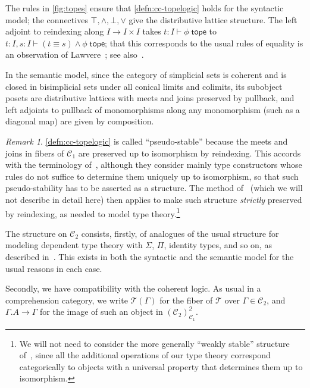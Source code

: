 \documentclass[12pt]{amsart}
\theoremstyle{plain}
\theoremstyle{definition}
\theoremstyle{remark}
\newtheorem{rmk}[thm]{Remark}
\numberwithin{equation}{section}
\newcommand{\jdeq}{\equiv}
\newcommand{\types}{\vdash}
\newcommand{\tope}{\;\mathsf{tope}}
\newcommand{\two}{\mathbb{2}}
\newcommand{\C}{\mathcal{C}}
\newcommand{\T}{\mathcal{T}}
\begin{document}
The rules in \cref{fig:topes} ensure that \cref{defn:cc-topelogic} holds for the syntactic model; the connectives $\top,\land,\bot,\lor$ give the distributive lattice structure.
The left adjoint to reindexing along $I\to I\times I$ takes $t:I \types \phi\tope$ to $t:I,s:I \types (t\jdeq s)\land \phi \tope$; that this corresponds to the usual rules of equality is an observation of Lawvere~\cite{lawvere}; see also~\cite{J}.

In the semantic model, since the category of simplicial sets is coherent {and is closed in bisimplicial sets under all conical limits and colimits,} its subobject posets are distributive lattices with meets and joins preserved by pullback, and left adjoints to pullback of monomorphisms along any monomorphism (such as a diagonal map) are given by composition.

\begin{rmk}
\cref{defn:cc-topelogic} is called ``pseudo-stable'' because the meets and joins in fibers of $\C_1$ are preserved up to isomorphism by reindexing.
This accords with the terminology of~\cite{LW}, although they consider mainly type constructors whose rules do not suffice to determine them uniquely up to isomorphism, so that such pseudo-stability has to be asserted as a structure.
The method of~\cite{LW} (which we will not describe in detail here) then applies to make such structure \emph{strictly} preserved by reindexing, as needed to model type theory.\footnote{We will not need to consider the more generally ``weakly stable'' structure of~\cite{LW}, since all the additional operations of our type theory correspond categorically to objects with a universal property that determines them up to isomorphism.}
\end{rmk}

The structure on $\C_2$ consists, firstly, of analogues of the usual structure for modeling dependent type theory with $\Sigma$, $\Pi$, identity types, and so on, as described in~\cite{LW}.
This exists in both the syntactic and the semantic model for the usual reasons in each case.

Secondly, we have compatibility with the coherent logic.
As usual in a comprehension category, we write $\T(\Gamma)$ for the fiber of $\T$ over $\Gamma\in\C_2$, and $\Gamma.A\to\Gamma$ for the image of such an object in $(\C_2)^\two_{\C_1}$.
\end{document}
